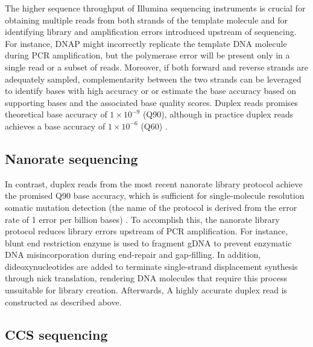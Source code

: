 The higher sequence throughput of Illumina sequencing instruments is crucial for obtaining multiple reads from both strands of the template molecule and for identifying library and amplification errors introduced upstream of sequencing. For instance, DNAP might incorrectly replicate the template DNA molecule during PCR amplification, but the polymerase error will be present only in a single read or a subset of reads. Moreover, if both forward and reverse strands are adequately sampled, complementarity between the two strands can be leveraged to identify bases with high accuracy or \cite{Schmitt2012-yr} or estimate the base accuracy \cite{Abascal2021-pk} based on supporting bases and the associated base quality scores. Duplex reads promises theoretical base accuracy of $1 \times 10^{-9}$ (Q90), although in practice duplex reads achieves a base accuracy of $1 \times 10^{-6}$ (Q60) \cite{Schmitt2012-yr}.

\subsection{Nanorate sequencing}

In contrast, duplex reads from the most recent nanorate library protocol achieve the promised Q90 base accuracy, which is sufficient for single-molecule resolution somatic mutation detection (the name of the protocol is derived from the error rate of 1 error per billion bases) \cite{Abascal2021-pk}. To accomplish this, the nanorate library protocol reduces library errors upstream of PCR amplification. For instance, blunt end restriction enzyme is used to fragment gDNA to prevent enzymatic DNA misincorporation during end-repair and gap-filling. In addition, dideoxynucleotides are added to terminate single-strand displacement synthesis through nick translation, rendering DNA molecules that require this process unsuitable for library creation. Afterwards, A highly accurate duplex read is constructed as described above.  

\subsection{CCS sequencing}

